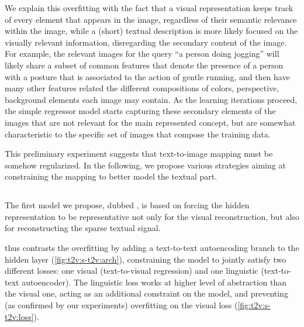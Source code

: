 We explain this overfitting with the fact that a visual representation keeps track of every element that appears in the image, regardless of their semantic relevance within the image, while a (short) textual description is more likely focused on the visually relevant information, disregarding the secondary content of the image.
For example, the relevant images for the query ``a person doing jogging'' will likely share a subset of common features that denote the presence of a person with a posture that is associated to the action of gentle running, and then have many other features related the different compositions of colors, perspective, background elements each image may contain.
As the learning iterations proceed, the simple regressor model starts capturing these secondary elements of the images that are not relevant for the main represented concept, but are somewhat characteristic to the specific set of images that compose the training data.

This preliminary experiment suggests that text-to-image mapping must be somehow regularized.
In the following, we propose various strategies aiming at constraining the mapping to better model the textual part.
\subsection{\sparsettv{}}
\label{subsec:t2v:sparse-t2v}


The first model we propose, dubbed \sparsettv{}, is based on forcing the hidden representation to be representative not only for the visual reconstruction, but also for reconstructing the sparse textual signal.

\sparsettv{} thus contrasts the overfitting by adding a text-to-text autoencoding branch to the hidden layer (\ref{fig:t2v:s-t2v:arch}), constraining the model to jointly satisfy two different losses: one visual (text-to-visual regression) and one linguistic (text-to-text autoencoder).
The linguistic loss works at higher level of abstraction than the visual one, acting as an additional constraint on the model, and preventing (as confirmed by our experiments) overfitting on the visual loss (\ref{fig:t2v:s-t2v:loss}).


